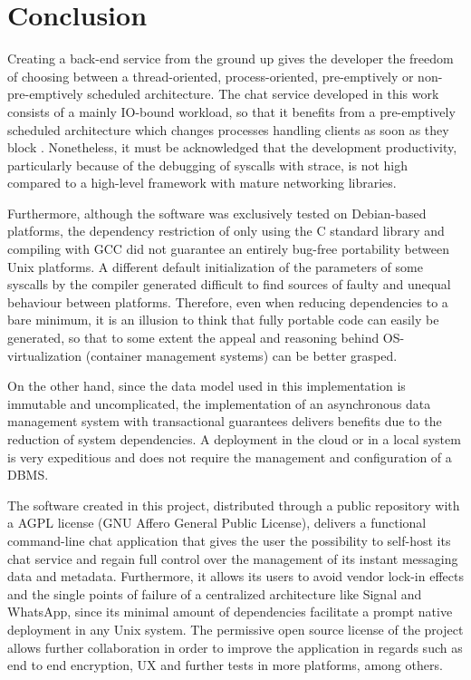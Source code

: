 \section{Conclusion}
Creating a back-end service from the ground up gives the developer the freedom of choosing between a thread-oriented, process-oriented, pre-emptively or non-pre-emptively scheduled architecture. The chat service developed in this work consists of a mainly IO-bound workload, so that it benefits from a pre-emptively scheduled architecture which changes processes handling clients as soon as they block \cite{Kennedy2018}. Nonetheless, it must be acknowledged that the development productivity, particularly because of the debugging of syscalls with strace, is not high compared to a high-level framework with mature networking libraries.

Furthermore, although the software was exclusively tested on Debian-based platforms, the dependency restriction of only using the C standard library and compiling with GCC did not guarantee an entirely bug-free portability between Unix platforms. A different default initialization of the parameters of some syscalls by the compiler generated difficult to find sources of faulty and unequal behaviour between platforms. Therefore, even when reducing dependencies to a bare minimum, it is an illusion to think that fully portable code can easily be generated, so that to some extent the appeal and reasoning behind OS-virtualization (container management systems) can be better grasped.

On the other hand, since the data model used in this implementation is immutable and uncomplicated, the implementation of an asynchronous data management system with transactional guarantees delivers benefits due to the reduction of system dependencies. A deployment in the cloud or in a local system is very expeditious and does not require the management and configuration of a DBMS.

The software created in this project, distributed through a public repository with a AGPL license (GNU Affero General Public License), delivers a functional command-line chat application that gives the user the possibility to self-host its chat service and regain full control over the management of its instant messaging data and metadata. Furthermore, it allows its users to avoid vendor lock-in effects and the single points of failure of a centralized architecture like Signal and WhatsApp, since its minimal amount of dependencies facilitate a prompt native deployment in any Unix system. The permissive open source license of the project allows further collaboration in order to improve the application in regards such as end to end encryption, UX and further tests in more platforms, among others.